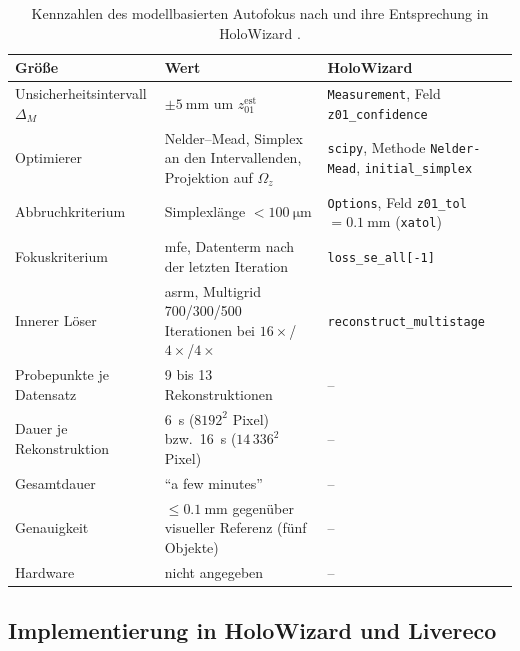 \begin{table}[tb]
  \centering
  \caption[Kennzahlen des modellbasierten Autofokus]{%
    Kennzahlen des modellbasierten Autofokus nach \cite{dora2025autofocus}
    und ihre Entsprechung in HoloWizard \cite{dora2026holowizard}.}
  \label{tab:stand:dora-kennzahlen}
  \footnotesize
  \begin{tabular}{@{}L{3.0cm} L{6.2cm} L{4.5cm}@{}}
    \toprule
    Größe & Wert & HoloWizard \\
    \midrule
    Unsicherheitsintervall $\Delta_M$ & $\pm\qty{5}{\milli\metre}$ um $z^{\mathrm{est}}_{01}$ & \texttt{Measurement}, Feld \texttt{z01\_confidence} \\
    \addlinespace
    Optimierer & Nelder--Mead, Simplex an den Intervallenden, Projektion auf $\Omega_z$ & \texttt{scipy}, Methode \texttt{Nelder-Mead}, \texttt{initial\_simplex} \\
    \addlinespace
    Abbruchkriterium & Simplexlänge $< \qty{100}{\micro\metre}$ & \texttt{Options}, Feld \texttt{z01\_tol} $= \qty{0.1}{\milli\metre}$ (\texttt{xatol}) \\
    \addlinespace
    Fokuskriterium & \acs{mfe}, Datenterm nach der letzten Iteration & \texttt{loss\_se\_all[-1]} \\
    \addlinespace
    Innerer Löser & \acs{asrm}, Multigrid 700/300/500 Iterationen bei $16\times$/$4\times$/$4\times$ & \texttt{reconstruct\_multistage} \\
    \addlinespace
    Probepunkte je Datensatz & 9 bis 13 Rekonstruktionen & -- \\
    \addlinespace
    Dauer je Rekonstruktion & \qty{6}{\second} ($8192^2$ Pixel) bzw.\ \qty{16}{\second} ($14\,336^2$ Pixel) & -- \\
    \addlinespace
    Gesamtdauer & \enquote{a few minutes} & -- \\
    \addlinespace
    Genauigkeit & $\le \qty{0.1}{\milli\metre}$ gegenüber visueller Referenz (fünf Objekte) & -- \\
    \addlinespace
    Hardware & nicht angegeben & -- \\
    \bottomrule
  \end{tabular}
\end{table}

\subsection{Implementierung in HoloWizard und Livereco}

